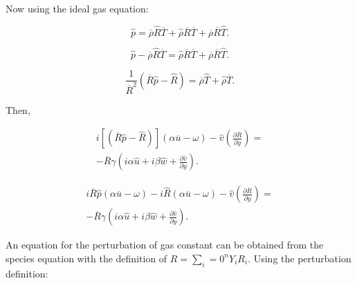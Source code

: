 Now using the ideal gas equation:

\begin{equation*}
   \hat{p}
   = 
   \overline{\rho}
   \hat{R}
   \overline{T}
   +
   \hat{\rho}
   \overline{R}
   \overline{T}
   +
   \overline{\rho}
   \overline{R}
   \hat{T}
   .
\end{equation*}

\begin{equation*}
   \hat{p}
   -
   \overline{\rho}
   \hat{R}
   \overline{T}
   = 
   \hat{\rho}
   \overline{R}
   \overline{T}
   +
   \overline{\rho}
   \overline{R}
   \hat{T}
   .
\end{equation*}

\begin{equation*}
   \frac{1}{\overline{R}^2}
   \left(
        \overline{R}\hat{p}
        -
        \hat{R}
   \right)
   = 
   \overline{\rho}
   \hat{T}
   +
   \hat{\rho}
   \overline{T}
   .
\end{equation*}

Then, 

\begin{equation*} 
\begin{split} 
i
\left[
   \left(
        \overline{R}\hat{p}
        -
        \hat{R}
   \right)
\right]
    \left(
    \alpha 
    \overline{u}
    -
    \omega 
    \right)
-
\hat{v}
\left(
    \frac{\partial \overline{R}}{\partial y} 
\right)
=
\\
-
\overline{R}
\gamma
\left(
i
\alpha
\hat{u}
+
i
\beta
\hat{w}
+
\frac{\partial \hat{v}}{\partial y}
\right)
.
\end{split} 
\end{equation*} 

\begin{equation*} 
\begin{split} 
    i
    \overline{R}\hat{p}
    \left(
    \alpha 
    \overline{u}
    -
    \omega 
    \right)
    -
    i
    \hat{R}
    \left(
    \alpha 
    \overline{u}
    -
    \omega 
    \right)
-
\hat{v}
\left(
    \frac{\partial \overline{R}}{\partial y} 
\right)
=
\\
-
\overline{R}
\gamma
\left(
i
\alpha
\hat{u}
+
i
\beta
\hat{w}
+
\frac{\partial \hat{v}}{\partial y}
\right)
.
\end{split} 
\label{withR}
\end{equation*} 

An equation for the perturbation of gas constant  can be obtained 
from the species equation with 
the definition of $R=\sum_i=0^n Y_i R_i$. 
Using the perturbation definition: 

